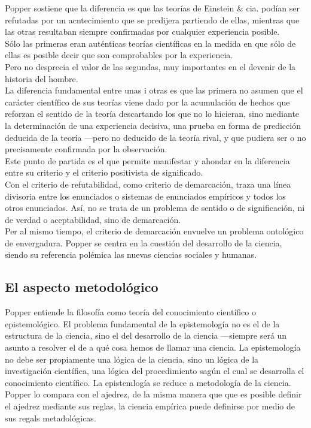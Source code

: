 \documentclass[a4paper, 11pt, twocolumn, spanish]{article}
\begin{document}
Popper sostiene que la diferencia es que las teorías de Einstein \&
cia. podían ser refutadas por un acntecimiento que se predijera
partiendo de ellas, mientras que las otras resultaban siempre
confirmadas por cualquier experiencia posible.\\
Sólo las primeras eran auténticas teorías científicas en la medida en
que sólo de ellas es posible decir que son comprobables por la
experiencia.\\
Pero no desprecia el valor de las segundas, muy importantes en el
devenir de la historia del hombre.\\


La diferencia fundamental entre unas i otras es que las primera no
asumen que el carácter científico de sus teorías viene dado por la
acumulación de hechos que reforzan el sentido de la teoría descartando
los que no lo hicieran, sino mediante la determinación de una
experiencia decisiva, una prueba en forma de predicción deducida de la
teoría —pero no deducido de la teoría rival, y que pudiera ser o no
precisamente confirmada por la observación.\\

Este punto de partida es el que permite manifestar y ahondar en la
diferencia entre su criterio y el criterio positivista de
significado.\\
Con el criterio de refutabilidad, como criterio de demarcación, traza
una línea divisoria entre los enunciados o sistemas de enunciados
empíricos y todos los otros enunciados. Así, no se trata de un
problema de sentido o de significación, ni de verdad o aceptabilidad,
sino de demarcación.\\

Per al mismo tiempo, el criterio de demarcación envuelve un problema
ontológico de envergadura. Popper se centra en la cuestión del
desarrollo de la ciencia, siendo su referencia polémica las nuevas
ciencias sociales y humanas.

\subsection{El aspecto metodológico}
\label{sec:org41f4bd7}



Popper entiende la filosofía como teoría del conocimiento científico o
epistemológico. El problema fundamental de la epistemología no es el
de la estructura de la ciencia, sino el del desarrollo de la ciencia
—siempre será un asunto a resolver el de a qué cosa hemos de llamar
una ciencia. La epistemología no debe ser propiamente una lógica de la
ciencia, sino un lógica de la investigación científica, una lógica del
procedimiento sagún el cual se desarrolla el conocimiento
científico. La epistemlogía se reduce a metodología de la ciencia.\\
Popper lo compara con el ajedrez, de la misma manera que que es
posible definir el ajedrez mediante sus reglas, la ciencia empírica
puede definirse por medio de sus regals metadológicas.\\
\end{document}
